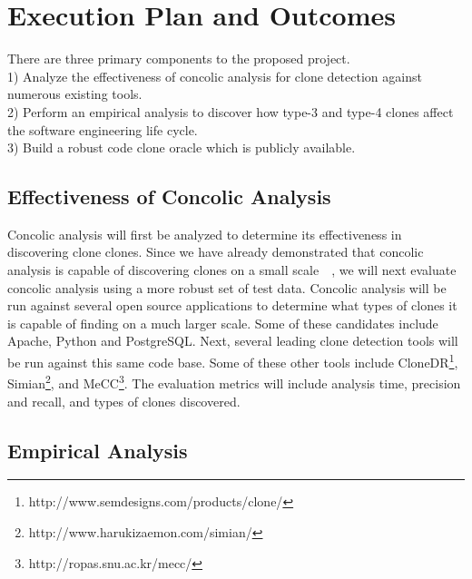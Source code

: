 \documentclass{article}
\begin{document}
\section{Execution Plan and Outcomes}


There are three primary components to the proposed project. \\
1) Analyze the effectiveness of concolic analysis for clone detection against numerous existing tools. \\
2) Perform an empirical analysis to discover how type-3 and type-4 clones affect the software engineering life cycle. \\
3) Build a robust code clone oracle which is publicly available. 


\subsection{Effectiveness of Concolic Analysis}

Concolic analysis will first be analyzed to determine its effectiveness in discovering clone clones. Since we have already demonstrated that concolic analysis is capable of discovering clones on a small scale~\cite{wcre2013}~\cite{Dan123}, we will next evaluate concolic analysis using a more robust set of test data. Concolic analysis will be run against several open source applications to determine what types of clones it is capable of finding on a much larger scale. Some of these candidates include Apache, Python and PostgreSQL. Next, several leading clone detection tools will be run against this same code base. Some of these other tools include CloneDR\footnote{http://www.semdesigns.com/products/clone/}, Simian\footnote{http://www.harukizaemon.com/simian/}, and MeCC\footnote{http://ropas.snu.ac.kr/mecc/}. The evaluation metrics will include analysis time, precision and recall, and types of clones discovered.

\subsection{Empirical Analysis}
\end{document}

